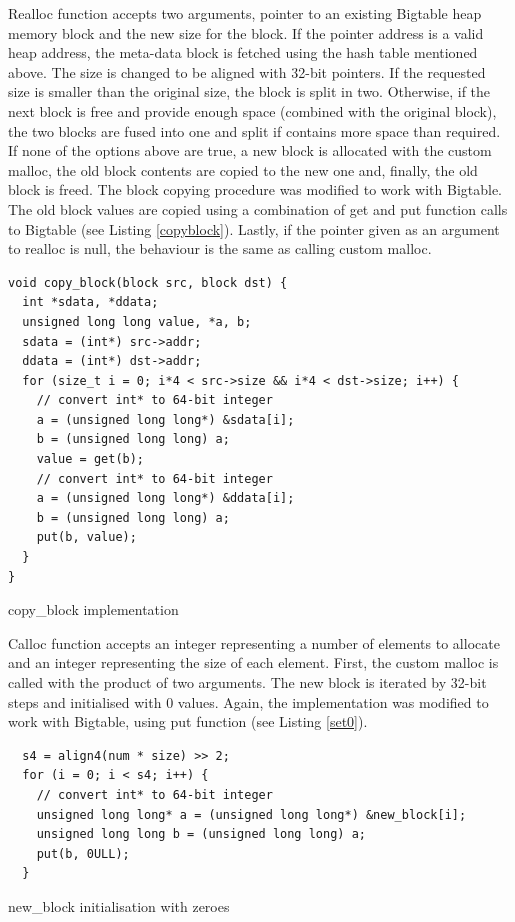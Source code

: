 \documentclass[bsc,frontabs,twoside,singlespacing,parskip,deptreport]{infthesis}     %
\begin{document}
Realloc function accepts two arguments, pointer to an existing Bigtable heap memory block and the new size for the block. If the pointer address is a valid heap address, the meta-data block is fetched using the hash table mentioned above. The size is changed to be aligned with 32-bit pointers. If the requested size is smaller than the original size, the block is split in two. Otherwise, if the next block is free and provide enough space (combined with the original block), the two blocks are fused into one and split if contains more space than required. If none of the options above are true, a new block is allocated with the custom malloc, the old block contents are copied to the new one and, finally, the old block is freed. The block copying procedure was modified to work with Bigtable. The old block values are copied using a combination of get and put function calls to Bigtable (see Listing \ref{copyblock}). Lastly, if the pointer given as an argument to realloc is null, the behaviour is the same as calling custom malloc.

\begin{listing}
\begin{verbatim}
void copy_block(block src, block dst) {
  int *sdata, *ddata;
  unsigned long long value, *a, b;
  sdata = (int*) src->addr;
  ddata = (int*) dst->addr;
  for (size_t i = 0; i*4 < src->size && i*4 < dst->size; i++) {
    // convert int* to 64-bit integer
    a = (unsigned long long*) &sdata[i];
    b = (unsigned long long) a;  
    value = get(b);
    // convert int* to 64-bit integer
    a = (unsigned long long*) &ddata[i];
    b = (unsigned long long) a;
    put(b, value);
  }
}
\end{verbatim}
\caption{copy\_block implementation}
\label{copyblock}
\end{listing}

Calloc function accepts an integer representing a number of elements to allocate and an integer representing the size of each element. First, the custom malloc is called with the product of two arguments. The new block is iterated by 32-bit steps and initialised with 0 values. Again, the implementation was modified to work with Bigtable, using put function (see Listing \ref{set0}).

\begin{listing}
\begin{verbatim}
  s4 = align4(num * size) >> 2;
  for (i = 0; i < s4; i++) {
    // convert int* to 64-bit integer
    unsigned long long* a = (unsigned long long*) &new_block[i];
    unsigned long long b = (unsigned long long) a;
    put(b, 0ULL);
  }
\end{verbatim}
\caption{new\_block initialisation with zeroes}
\label{set0}
\end{listing}
\end{document}
